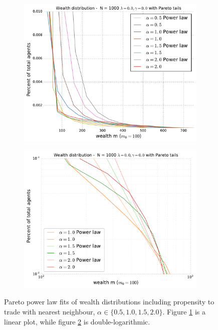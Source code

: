 \documentclass[10pt, a4paper]{amsart}
\begin{document}
\begin{figure}
\begin{subfigure}{.49\textwidth}
	\centering
	\includegraphics[width=\linewidth]{../figures/5d/5d_0-var-0-PARETO.pdf}
	\caption{}
	\label{fig:neighbourpareto1}
\end{subfigure}
\begin{subfigure}{.49\textwidth}
	\centering
	\includegraphics[width=\linewidth]{../figures/5d/5d_0-var-0-POWERLOG.pdf}
	\caption{}
	\label{fig:neighourpareto2}
\end{subfigure}
\caption{Pareto power law fits of wealth distributions including propensity to trade with nearest neighbour, $\alpha\in\{0.5,1.0,1.5,2.0\}$. Figure \ref{fig:neighbourpareto1} is a linear plot, while figure \ref{fig:neighourpareto2} is double-logarithmic.}
\label{fig:neighbourpareto}
\end{figure}
\end{document}
